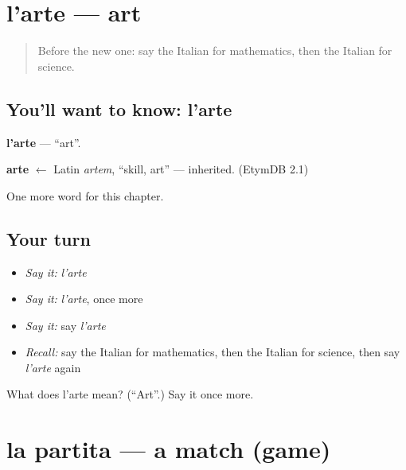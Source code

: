 \section[l'arte]{l'arte — art}

\label{lesson:IT-C173-arte}



\begin{quote}
Before the new one: say the Italian for mathematics, then the Italian for science.
\end{quote}

\subsection*{You'll want to know: l'arte}
\textbf{l'arte} — \textquotedblleft{}art\textquotedblright{}.

\begin{cousinweb}
\textbf{arte} $\leftarrow$ Latin \emph{artem}, \textquotedblleft{}skill, art\textquotedblright{} — inherited. (EtymDB 2.1)
\end{cousinweb}

\begin{grammarlens}[title={What you've built}]
One more word for this chapter.
\end{grammarlens}

\subsection*{Your turn}
\begin{itemize}
\raggedright
  \item \emph{Say it:} \emph{l'arte}
  \item \emph{Say it:} \emph{l'arte}, once more
  \item \emph{Say it:} say \emph{l'arte}
  \item \emph{Recall:} say the Italian for mathematics, then the Italian for science, then say \emph{l'arte} again
\end{itemize}

\begin{tcolorbox}[breakable,colback=teal!4,colframe=teal!35!black,title={Before you move on}]
What does l'arte mean? (\textquotedblleft{}Art\textquotedblright{}.) Say it once more.
\end{tcolorbox}
\section[la partita]{la partita — a match (game)}

